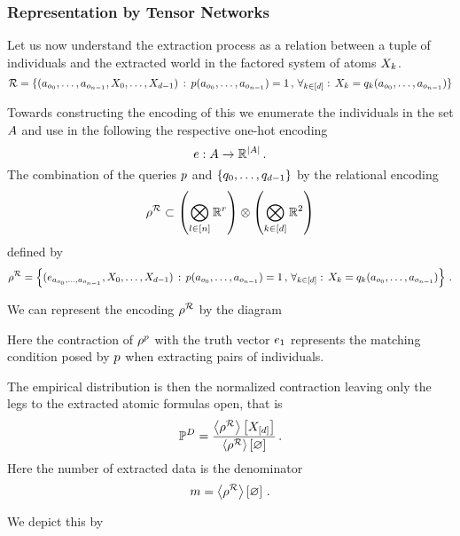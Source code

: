 \subsubsection{Representation by Tensor Networks}

Let us now understand the extraction process as a relation between a tuple of individuals and the extracted world in the factored system of atoms $X_{k}$.
	\[ \mathcal{R}
	= \{ (a_{o_{0}},\ldots,a_{o_{n-1}}, X_{0},\ldots,X_{d-1}) 
	\, : \,  p(a_{o_{0}},\ldots,a_{o_{n-1}}) = 1 \, , \, \forall_{k\in[d]} : \,  X_{k} = q_{k}(a_{o_{0}},\ldots,a_{o_{n-1}}) \}\]
	
Towards constructing the encoding of this we enumerate the individuals in the set $A$ and use in the following the respective one-hot encoding 
	\[ e : A \rightarrow \mathbb{R}^{\left|A\right|} \, . \]
The combination of the queries $p$ and $\{q_{0},\ldots,q_{d-1}\}$ by the relational encoding
	\[\rho^{\mathcal{R}} \subset \left(\bigotimes_{l\in[n]}\mathbb{R}^{r}\right) \otimes \left(\bigotimes_{k\in[d]}\mathbb{R}^2\right) \]
defined by
	\[ \rho^{\mathcal{R}} 
	= \left\{ (e_{a_{o_{0}},\ldots,a_{o_{n-1}}}, X_{0},\ldots,X_{d-1}) 
	\, : \, p(a_{o_{0}},\ldots,a_{o_{n-1}}) = 1 \, , \, \forall_{k\in[d]} : \,  X_{k} = q_{k}(a_{o_{0}},\ldots,a_{o_{n-1}}) \right\} \, . \]

%
We can represent the encoding $\rho^{\mathcal{R}}$ by the diagram
\begin{center}
	
\end{center}
Here the contraction of $\rho^{p}$ with the truth vector $e_1$ represents the matching condition posed by $p$ when extracting pairs of individuals.

The empirical distribution is then the normalized contraction leaving only the legs to the extracted atomic formulas open, that is
\begin{align*}
 	\mathbb{P}^{D} 
	= \frac{
	\left\langle \rho^{\mathcal{R}}\right\rangle \left[ X_{[d]} \right]
	}{
	\left\langle \rho^{\mathcal{R}}\right\rangle \left[ \varnothing \right]
	}  \, . 
\end{align*}
Here the number of extracted data is the denominator
	\[ m = \left\langle \rho^{\mathcal{R}}\right\rangle \left[ \varnothing \right] \, .  \]
	
We depict this by
\begin{center}
	
\end{center}




